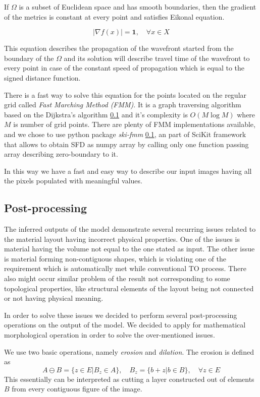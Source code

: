 If $\Omega$ is a subset of Euclidean space and has smooth boundaries, then the gradient of the metrics is constant at every point and satisfies Eikonal equation.

\[
 |\nabla f(x)| = \mathbf{1}, \quad \forall x \in X
\]

This equation describes the propagation of the wavefront started from the boundary of the $\Omega$ and its solution will describe travel time of the wavefront to every point in case of the constant speed of propagation which is equal to the signed distance function.

There is a fast way to solve this equation for the points located on the regular grid called \textit{Fast Marching Method (FMM)}.
It is a graph traversing algorithm based on the Dijkstra's algorithm \ref{} and it's complexity is $O(M \log M)$ where $M$ is number of grid points.
There are plenty of FMM implementations available, and we chose to use python package \textit{ski-fmm} \ref{}, an part of SciKit framework that allows to obtain SFD as numpy array by calling only one function passing array describing zero-boundary to it.

In this way we have a fast and easy way to describe our input images having all the pixels populated with meaningful values.

 
\subsection{Post-processing}

The inferred outputs of the model demonstrate several recurring issues related to the material layout having incorrect physical properties.
One of the issues is material having the volume not equal to the one stated as input.
The other issue is material forming non-contiguous shapes, which is violating one of the requirement which is automatically met while conventional TO process.
There also might occur similar problem of the result not corresponding to some topological properties, like structural elements of the layout being not connected or not having physical meaning.

In order to solve these issues we decided to perform several post-processing operations on the output of the model.
We decided to apply for mathematical morphological operation in order to solve the over-mentioned issues.

We use two basic operations, namely \textit{erosion} and \textit{dilation}.
The erosion is defined as 
\begin{equation}
A \ominus B = \{z \in E | B_{z} \in A \}, \quad B_{z}=\{ b+z | b \in B \}, \quad \forall z \in E 
\end{equation} 
This essentially can be interpreted as cutting a layer constructed out of elements $B$ from every contiguous figure of the image.

